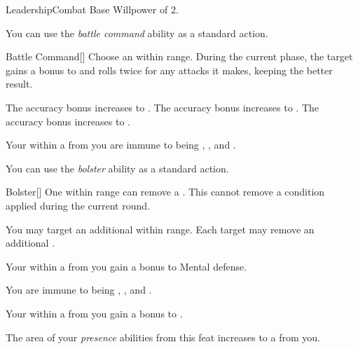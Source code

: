     \begin{feat}{Leadership}{Combat}
        \featpre Base Willpower of 2.

         You can use the \textit{battle command} ability as a standard action.
        \begin{freeability}{Battle Command}[]
            Choose an  within \rngmed range.
            During the current phase, the target gains a  bonus to  and rolls twice for any attacks it makes, keeping the better result.

            \rankline
             The accuracy bonus increases to .
             The accuracy bonus increases to .
             The accuracy bonus increases to .
        \end{freeability}

         Your  within a \arealarge {} from you are immune to being , , and .

         You can use the \textit{bolster} ability as a standard action.
        \begin{freeability}{Bolster}[]
            One  within \rngclose range can remove a .
            This cannot remove a condition applied during the current round.

            \rankline
             You may target an additional  within range.
             Each target may remove an additional .
        \end{freeability}

         Your  within a \arealarge {} from you gain a  bonus to Mental defense.

         You are immune to being , , and .

         Your  within a \arealarge {} from you gain a  bonus to .

         The area of your \textit{presence} abilities from this feat increases to a \areahuge {} from you.
    \end{feat}

